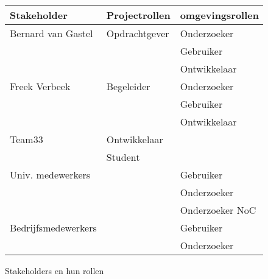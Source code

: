\begin{figure}
{\tiny
\begin{center}
\begin{tabular}{lll}\hline
{\bf Stakeholder}    & {\bf Projectrollen}   & {\bf omgevingsrollen} \\\hline
Bernard van Gastel   & Opdrachtgever         & Onderzoeker \\
                     &                       & Gebruiker \\
                     &                       & Ontwikkelaar \\
Freek Verbeek        & Begeleider            & Onderzoeker \\
                     &                       & Gebruiker \\
                     &                       & Ontwikkelaar \\
Team33               & Ontwikkelaar          & \\
                     & Student               & \\
Univ. medewerkers    &                       & Gebruiker \\
                     &                       & Onderzoeker \\
                     &                       & Onderzoeker NoC \\
Bedrijfsmedewerkers  &                       & Gebruiker \\
                     &                       & Onderzoeker \\
\hline
\end{tabular}
\end{center}
}%
\caption{Stakeholders en hun rollen}\label{fig:stakeholders}
\end{figure}

